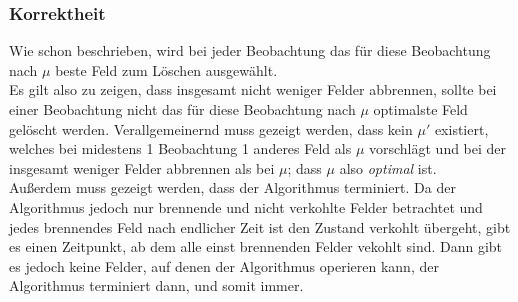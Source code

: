 \subsubsection{Korrektheit}
Wie schon beschrieben, wird bei jeder Beobachtung das für diese Beobachtung nach $\mu$ beste Feld zum Löschen ausgewählt.\\
Es gilt also zu zeigen, dass insgesamt nicht weniger Felder abbrennen, sollte bei einer Beobachtung nicht das für diese Beobachtung nach $\mu$ optimalste Feld gelöscht werden. Verallgemeinernd muss gezeigt werden, dass kein $\mu'$ existiert, welches bei midestens 1 Beobachtung 1 anderes Feld als $\mu$ vorschlägt und bei der insgesamt weniger Felder abbrennen als bei $\mu$; dass $\mu$ also \emph{optimal} ist.\\
Außerdem muss gezeigt werden, dass der Algorithmus terminiert. Da der Algorithmus jedoch nur brennende und nicht verkohlte Felder betrachtet und jedes brennendes Feld nach endlicher Zeit ist den Zustand verkohlt übergeht, gibt es einen Zeitpunkt, ab dem alle einst brennenden Felder vekohlt sind. Dann gibt es jedoch keine Felder, auf denen der Algorithmus operieren kann, der Algorithmus terminiert dann, und somit immer.


